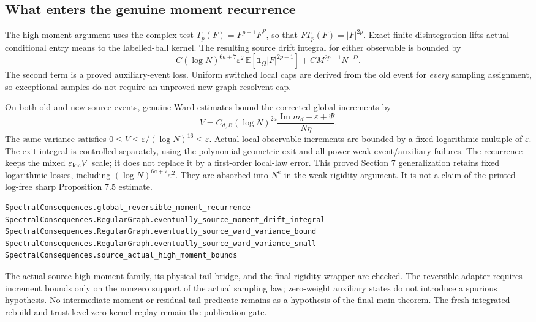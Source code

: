 \documentclass[11pt]{article}
\newcommand{\EE}{\mathbb E}
\newcommand{\Om}{\Omega}
\newcommand{\im}{\operatorname{Im}}
\newif\ifIntegratedAudit
\begin{document}
\subsection{What enters the genuine moment recurrence}

The high-moment argument uses the complex test
$T_p(F)=F^{p-1}\overline F^{\,p}$, so that $F T_p(F)=|F|^{2p}$.
Exact finite disintegration lifts actual conditional entry means to the labelled-ball
kernel. The resulting source drift integral for either observable is bounded by
\[
 C(\log N)^{6a+7}\varepsilon^2\,
      \EE[\mathbf1_{\Om}|F|^{2p-1}]
 +C M^{2p-1}N^{-D} .
 \tag{5}
\]
The second term is a proved auxiliary-event loss. Uniform switched local caps are derived
from the old event for \emph{every} sampling assignment, so exceptional samples do not
require an unproved new-graph resolvent cap.

On both old and new source events, genuine Ward estimates bound the corrected global
increments by
\[
 V=C_{d,B}(\log N)^{2a}
        \frac{\im m_d+\varepsilon+\Psi}{N\eta}.
 \tag{6}
\]
The same variance satisfies $0\leq V\leq\varepsilon/(\log N)^{16}\leq\varepsilon$.
Actual local observable increments are bounded by a fixed logarithmic multiple of
$\varepsilon$. The exit integral is controlled separately, using the polynomial geometric
exit and all-power weak-event/auxiliary failures. The recurrence keeps the mixed
$\varepsilon_{\rm loc}V$ scale; it does not replace it by a first-order local-law error.
This proved Section 7 generalization retains fixed logarithmic losses, including
$(\log N)^{6a+7}\varepsilon^2$. They are absorbed into $N^e$ in the weak-rigidity argument.
It is not a claim of the printed log-free sharp Proposition 7.5 estimate.

\begin{lstlisting}
SpectralConsequences.global_reversible_moment_recurrence
SpectralConsequences.RegularGraph.eventually_source_moment_drift_integral
SpectralConsequences.RegularGraph.eventually_source_ward_variance_bound
SpectralConsequences.RegularGraph.eventually_source_ward_variance_small
SpectralConsequences.source_actual_high_moment_bounds
\end{lstlisting}
The actual source high-moment family, its physical-tail bridge, and the final rigidity
wrapper are checked. The reversible adapter requires increment bounds only on the nonzero
support of the actual sampling law; zero-weight auxiliary states do not introduce a spurious
hypothesis. No intermediate moment or residual-tail predicate remains as a hypothesis of
the final main theorem. \ifIntegratedAudit The independent integrated rebuild and
trust-level-zero kernel replay have also passed.\else The fresh integrated rebuild and
trust-level-zero kernel replay remain the publication gate.\fi
\end{document}
